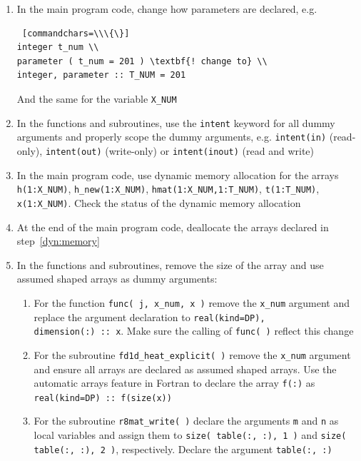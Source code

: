 \documentclass[12pt]{article}
\begin{document}
\begin{enumerate}
\begin{Verbatim} [commandchars=\\\{\}]
  \textbf{-dcolon_in_decls=Insert -character_decl=Keywords} \textbackslash \\
  fd1d_heat_explicit.f90 -o \textit{fd1d_heat_explicit.f90_pol}
mv \textit{fd1d_heat_explicit.f90_pol} fd1d_heat_explicit.f90
\end{Verbatim}
\item In the main program code, change how parameters are declared, e.g.
\begin{Verbatim} [commandchars=\\\{\}]
integer t_num \\
parameter ( t_num = 201 ) \textbf{! change to} \\
integer, parameter :: T_NUM = 201
\end{Verbatim}
And the same for the variable \texttt{X\_NUM}
\item In the functions and subroutines, use the \texttt{intent} keyword for all dummy arguments and properly
  scope the dummy arguments, e.g. \texttt{intent(in)} (read-only), \texttt{intent(out)} (write-only) or
  \texttt{intent(inout)} (read and write)
\item In the main program code, use dynamic memory allocation for the arrays \texttt{h(1:X\_NUM)}, 
\texttt{h\_new(1:X\_NUM)}, \texttt{hmat(1:X\_NUM,1:T\_NUM)}, \texttt{t(1:T\_NUM)}, \texttt{x(1:X\_NUM)}. Check
the status of the dynamic memory allocation\label{dyn:memory}
\item At the end of the main program code, deallocate the arrays declared in step~\ref{dyn:memory}
\item In the functions and subroutines, remove the size of the array and use assumed shaped
arrays as dummy arguments:
\begin{enumerate}
\item For the function \texttt{func( j, x\_num, x )} remove the \texttt{x\_num} argument and
replace the argument declaration to \texttt{real(kind=DP), dimension(:)\ ::\ x}. Make sure
the calling of \texttt{func( )} reflect this change
\item For the subroutine \texttt{fd1d\_heat\_explicit( )} remove the \texttt{x\_num} argument
and ensure all arrays are declared as assumed shaped arrays. Use the automatic arrays feature in Fortran
to declare the array \texttt{f(:)} as \texttt{real(kind=DP) ::\ f(size(x))}
\item For the subroutine \texttt{r8mat\_write( )} declare the arguments \texttt{m} and \texttt{n} as local variables
  and assign them
to \texttt{size( table(:, :), 1 )} and \texttt{size( table(:, :), 2 )}, respectively. Declare the argument \texttt{table(:, :)}

\end{enumerate}
\end{enumerate}
\end{document}
